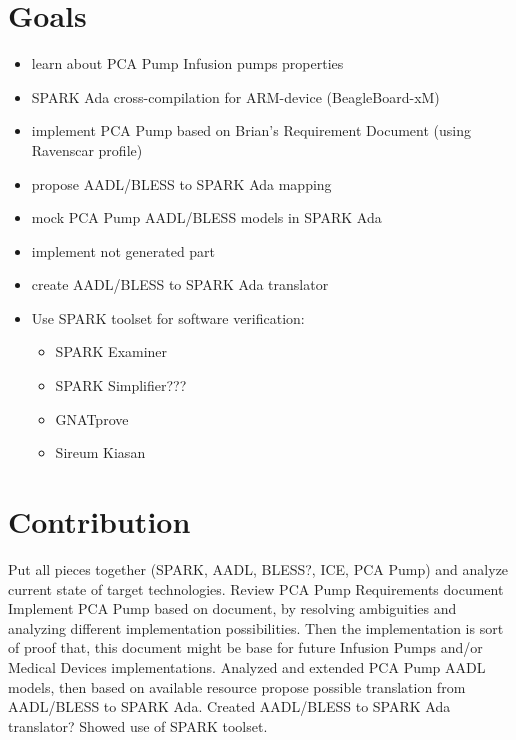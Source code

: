 \section{Goals}
\label{introduction:goals}
\begin{itemize}
	\item learn about PCA Pump Infusion pumps properties
	\item SPARK Ada cross-compilation for ARM-device (BeagleBoard-xM)
	\item implement PCA Pump based on Brian's Requirement Document (using Ravenscar profile)
	\item propose AADL/BLESS to SPARK Ada mapping
	\item mock PCA Pump AADL/BLESS models in SPARK Ada
	\item implement not generated part
	\item create AADL/BLESS to SPARK Ada translator
	\item Use SPARK toolset for software verification:
		\begin{itemize}
			\item SPARK Examiner
			\item SPARK Simplifier??? %
			\item GNATprove
			\item Sireum Kiasan
		\end{itemize}
\end{itemize}




\section{Contribution}
\label{introduction:contribution}
Put all pieces together (SPARK, AADL, BLESS?, ICE, PCA Pump) and analyze current state of target technologies.
Review PCA Pump Requirements document
Implement PCA Pump based on document, by resolving ambiguities and analyzing different implementation possibilities. Then the implementation is sort of proof that, this document might be base for future Infusion Pumps and/or Medical Devices implementations.
Analyzed and extended PCA Pump AADL models, then based on available resource propose possible translation from AADL/BLESS to SPARK Ada.
Created AADL/BLESS to SPARK Ada translator?
Showed use of SPARK toolset.


